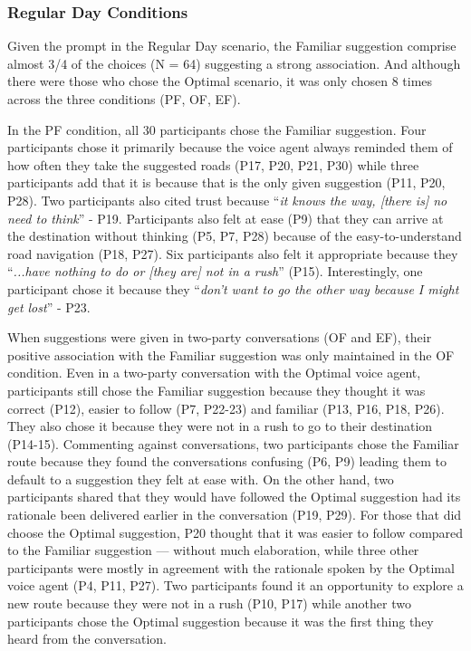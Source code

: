 \subsubsection{Regular Day Conditions}
Given the prompt in the Regular Day scenario, the Familiar suggestion comprise almost 3/4 of the choices (N = 64) suggesting a strong association. And although there were those who chose the Optimal scenario, it was only chosen 8 times across the three conditions (PF, OF, EF). 

In the PF condition, all 30 participants chose the Familiar suggestion. Four participants chose it primarily because the voice agent always reminded them of how often they take the suggested roads (P17, P20, P21, P30) while three participants add that it is because that is the only given suggestion (P11, P20, P28). Two participants also cited trust because ``\textit{it knows the way, [there is] no need to think}'' - P19. Participants also felt at ease (P9) that they can arrive at the destination without thinking (P5, P7, P28) because of the easy-to-understand road navigation (P18, P27). Six participants also felt it appropriate because they ``\textit{...have nothing to do or [they are] not in a rush}'' (P15). Interestingly, one participant chose it because they ``\textit{don't want to go the other way because I might get lost}'' - P23.

When suggestions were given in two-party conversations (OF and EF), their positive association with the Familiar suggestion was only maintained in the OF condition. Even in a two-party conversation with the Optimal voice agent, participants still chose the Familiar suggestion because they thought it was correct (P12), easier to follow (P7, P22-23) and familiar (P13, P16, P18, P26). They also chose it because they were not in a rush to go to their destination (P14-15). Commenting against conversations, two participants chose the Familiar route because they found the conversations confusing (P6, P9) leading them to default to a suggestion they felt at ease with. On the other hand, two participants shared that they would have followed the Optimal suggestion had its rationale been delivered earlier in the conversation (P19, P29). For those that did choose the Optimal suggestion, P20 thought that it was easier to follow compared to the Familiar suggestion — without much elaboration, while three other participants were mostly in agreement with the rationale spoken by the Optimal voice agent (P4, P11, P27). Two participants found it an opportunity to explore a new route because they were not in a rush (P10, P17) while another two participants chose the Optimal suggestion because it was the first thing they heard from the conversation. 

